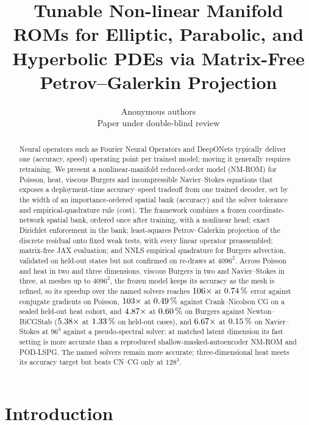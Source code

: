 \documentclass{article}
\title{Tunable Non-linear Manifold ROMs for Elliptic, Parabolic, and Hyperbolic PDEs via Matrix-Free Petrov--Galerkin Projection}
\author{Anonymous authors\\Paper under double-blind review}
\begin{document}
\maketitle

\begin{abstract}
Neural operators such as Fourier Neural Operators and DeepONets
typically deliver one (accuracy, speed) operating point per trained
model; moving it generally requires retraining. We present a
nonlinear-manifold reduced-order model (NM-ROM) for Poisson, heat,
viscous Burgers and incompressible Navier--Stokes equations that exposes a
deployment-time accuracy--speed tradeoff from one trained decoder, set by
the width of an importance-ordered spatial bank (accuracy) and the solver
tolerance and empirical-quadrature rule (cost). The framework combines a
frozen coordinate-network spatial bank, ordered once after training, with
a nonlinear head; exact
Dirichlet enforcement in the bank; least-squares
Petrov--Galerkin projection of the discrete residual onto fixed weak
tests, with every linear operator preassembled; matrix-free JAX
evaluation; and NNLS empirical quadrature for Burgers advection,
validated on held-out states but not confirmed on re-draws at $4096^2$. Across Poisson and heat in two and
three dimensions, viscous Burgers in two and Navier--Stokes in three, at
meshes up to $4096^2$, the frozen model keeps its accuracy as the mesh is
refined, so its speedup over the named solvers reaches $106\times$ at
$0.74\,\%$ error against conjugate gradients on Poisson,
$103\times$ at $0.49\,\%$ against Crank--Nicolson
CG on a sealed held-out heat cohort, and $4.87\times$ at
$0.60\,\%$ on Burgers against Newton--BiCGStab
($5.38\times$ at
$1.33\,\%$ on held-out cases), and
$6.67\times$ at $0.15\,\%$ on Navier--Stokes at $96^3$
against a pseudo-spectral solver; at matched latent
dimension its fast setting is more accurate than a reproduced
shallow-masked-autoencoder NM-ROM and POD-LSPG. The named solvers remain
more accurate; three-dimensional heat meets its accuracy target but
beats CN--CG only at $128^3$.
\end{abstract}

\section{Introduction}
\label{sec:intro}
\end{document}
